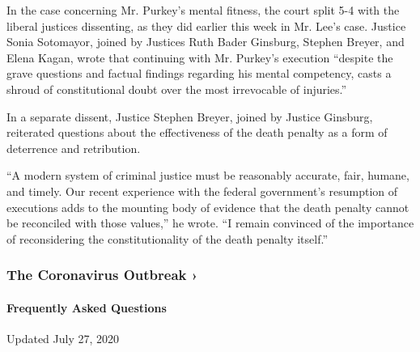 In the case concerning Mr. Purkey's mental fitness, the court split 5-4
with the liberal justices dissenting, as they did earlier this week in
Mr. Lee's case. Justice Sonia Sotomayor, joined by Justices Ruth Bader
Ginsburg, Stephen Breyer, and Elena Kagan, wrote that continuing with
Mr. Purkey's execution ``despite the grave questions and factual
findings regarding his mental competency, casts a shroud of
constitutional doubt over the most irrevocable of injuries.''

In a separate dissent, Justice Stephen Breyer, joined by Justice
Ginsburg, reiterated questions about the effectiveness of the death
penalty as a form of deterrence and retribution.

``A modern system of criminal justice must be reasonably accurate, fair,
humane, and timely. Our recent experience with the federal government's
resumption of executions adds to the mounting body of evidence that the
death penalty cannot be reconciled with those values,'' he wrote. ``I
remain convinced of the importance of reconsidering the
constitutionality of the death penalty itself.''

\href{https://www.nytimes.com/news-event/coronavirus?action=click\&pgtype=Article\&state=default\&region=MAIN_CONTENT_3\&context=storylines_faq}{}

\hypertarget{the-coronavirus-outbreak-}{%
\subsubsection{The Coronavirus Outbreak
›}\label{the-coronavirus-outbreak-}}

\hypertarget{frequently-asked-questions}{%
\paragraph{Frequently Asked
Questions}\label{frequently-asked-questions}}

Updated July 27, 2020

